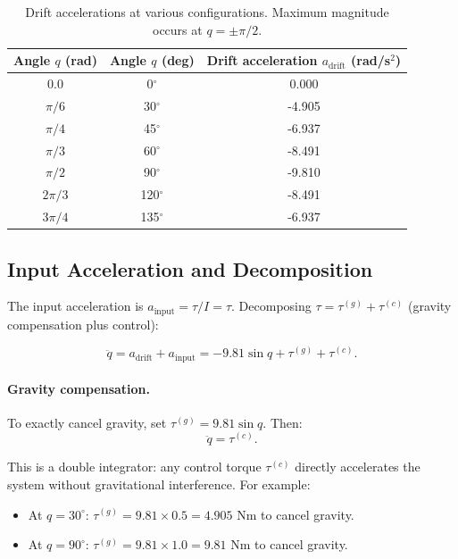 \begin{table}[h]
\centering
\begin{tabular}{c|cc}
Angle $q$ (rad) & Angle $q$ (deg) & Drift acceleration $a_{\text{drift}}$ (rad/s$^2$) \\
\hline
0.0 & 0$^\circ$ & 0.000 \\
$\pi/6$ & 30$^\circ$ & -4.905 \\
$\pi/4$ & 45$^\circ$ & -6.937 \\
$\pi/3$ & 60$^\circ$ & -8.491 \\
$\pi/2$ & 90$^\circ$ & -9.810 \\
$2\pi/3$ & 120$^\circ$ & -8.491 \\
$3\pi/4$ & 135$^\circ$ & -6.937 \\
\end{tabular}
\caption{Drift accelerations at various configurations. Maximum magnitude occurs at $q=\pm\pi/2$.}
\label{tab:ch3:drift-accel}
\end{table}

\subsection{Input Acceleration and Decomposition}

The input acceleration is $a_{\text{input}} = \tau / I = \tau$. Decomposing $\tau = \tau^{(g)} + \tau^{(c)}$
(gravity compensation plus control):

\begin{equation}
\ddot q = a_{\text{drift}} + a_{\text{input}} = -9.81\sin q + \tau^{(g)} + \tau^{(c)}.
\label{eq:ch3:pendulum-decomp-full}
\end{equation}

\paragraph{Gravity compensation.}
To exactly cancel gravity, set $\tau^{(g)} = 9.81\sin q$. Then:
\begin{equation}
\ddot q = \tau^{(c)}.
\label{eq:ch3:gravity-cancelled}
\end{equation}

This is a double integrator: any control torque $\tau^{(c)}$ directly accelerates the system
without gravitational interference. For example:
\begin{itemize}
\item At $q = 30^\circ$: $\tau^{(g)} = 9.81 \times 0.5 = 4.905$ N\textperiodcentered{}m to cancel gravity.
\item At $q = 90^\circ$: $\tau^{(g)} = 9.81 \times 1.0 = 9.81$ N\textperiodcentered{}m to cancel gravity.
\end{itemize}

